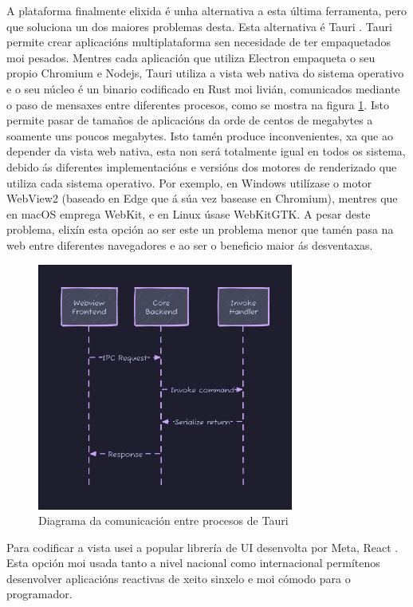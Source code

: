 A plataforma finalmente elixida é unha alternativa a esta última ferramenta, pero que soluciona un dos maiores problemas desta. Esta alternativa é Tauri \cite{Tauri}.
Tauri permite crear aplicacións multiplataforma sen necesidade de ter empaquetados moi pesados. Mentres cada aplicación que utiliza Electron empaqueta o seu propio Chromium e Nodejs, Tauri utiliza a vista web nativa do sistema operativo e o seu núcleo é un binario codificado en Rust \cite{Rust} moi livián, comunicados mediante o paso de mensaxes entre diferentes procesos, como se mostra na figura \ref{fig:TauriIPC}. Isto permite pasar de tamaños de aplicacións da orde de centos de megabytes a soamente uns poucos megabytes. Isto tamén produce inconvenientes, xa que ao depender da vista web nativa, esta non será totalmente igual en todos os sistema, debido ás diferentes implementacións e versións dos motores de renderizado que utiliza cada sistema operativo. Por exemplo, en Windows utilízase o motor WebView2 (baseado en Edge que á súa vez basease en Chromium), mentres que en macOS emprega WebKit, e en Linux úsase WebKitGTK. A pesar deste problema, elixín esta opción ao ser este un problema menor que tamén pasa na web entre diferentes navegadores e ao ser o beneficio maior ás desventaxas. 

\begin{figure}[hp!]
  \centering
  \includegraphics[width=0.75\textwidth]{imaxes/TauriIPC.png}
  \caption{Diagrama da comunicación entre procesos de Tauri}
  \label{fig:TauriIPC}
\end{figure}

Para codificar a vista usei a popular librería de UI desenvolta por Meta, React \cite{React}. Esta opción moi usada tanto a nivel nacional como internacional permítenos desenvolver aplicacións reactivas de xeito sinxelo e moi cómodo para o programador.


